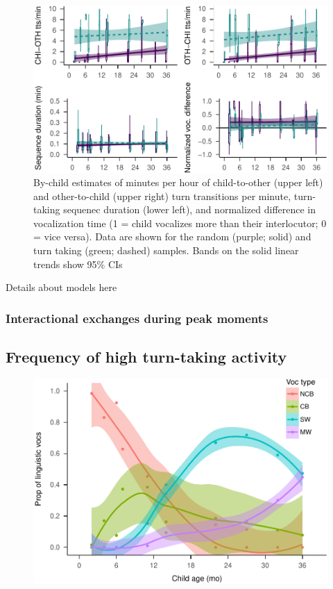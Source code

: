 \documentclass[floatsintext,man]{apa6}
\theoremstyle{definition}
\theoremstyle{definition}
\theoremstyle{definition}
\theoremstyle{remark}
\begin{document}
\begin{figure}
\centering
\includegraphics{Tseltal-CLE_files/figure-latex/fig2-1.pdf}
\caption{\label{fig:fig2}By-child estimates of minutes per hour of
child-to-other (upper left) and other-to-child (upper right) turn
transitions per minute, turn-taking sequenec duration (lower left), and
normalized difference in vocalization time (1 = child vocalizes more
than their interlocutor; 0 = vice versa). Data are shown for the random
(purple; solid) and turn taking (green; dashed) samples. Bands on the
solid linear trends show 95\% CIs}
\end{figure}

Details about models here

\subsubsection{Interactional exchanges during peak
moments}\label{interactional-exchanges-during-peak-moments}

\subsection{Frequency of high turn-taking
activity}\label{frequency-of-high-turn-taking-activity}

\begin{figure}
\centering
\includegraphics{Tseltal-CLE_files/figure-latex/plot_chi_voctypes_overall-1.pdf}
\caption{}
\end{figure}
\end{document}

